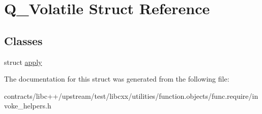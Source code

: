 \hypertarget{struct_q___volatile}{}\section{Q\+\_\+\+Volatile Struct Reference}
\label{struct_q___volatile}
\subsection*{Classes}
\begin{DoxyCompactItemize}
\item 
struct \mbox{\hyperlink{struct_q___volatile_1_1apply}{apply}}
\end{DoxyCompactItemize}


The documentation for this struct was generated from the following file\+:\begin{DoxyCompactItemize}
\item 
contracts/libc++/upstream/test/libcxx/utilities/function.\+objects/func.\+require/invoke\+\_\+helpers.\+h\end{DoxyCompactItemize}
